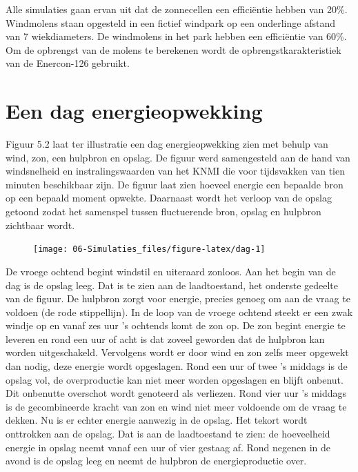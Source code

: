 \documentclass[
  11pt,
  a4paper,
]{book}
\begin{document}
Alle simulaties gaan ervan uit dat de zonnecellen een efficiëntie hebben van 20\%. Windmolens staan opgesteld in een fictief windpark op een onderlinge afstand van 7 wiekdiameters. De windmolens in het park hebben een efficiëntie van 60\%. Om de opbrengst van de molens te berekenen wordt de opbrengstkarakteristiek van de Enercon-126 gebruikt.

\hypertarget{een-dag-energieopwekking}{%
\section{Een dag energieopwekking}\label{een-dag-energieopwekking}}

Figuur 5.2 laat ter illustratie een dag energieopwekking zien met behulp van wind, zon, een hulpbron en opslag. De figuur werd samengesteld aan de hand van windsnelheid en instralingswaarden van het KNMI die voor tijdsvakken van tien minuten beschikbaar zijn. De figuur laat zien hoeveel energie een bepaalde bron op een bepaald moment opwekte. Daarnaast wordt het verloop van de opslag getoond zodat het samenspel tussen fluctuerende bron, opslag en hulpbron zichtbaar wordt.

\begin{figure}

{\centering \texttt{[image: 06-Simulaties\_files/figure-latex/dag-1]} 

}

\end{figure}

De vroege ochtend begint windstil en uiteraard zonloos. Aan het begin van de dag is de opslag leeg. Dat is te zien aan de laadtoestand, het onderste gedeelte van de figuur. De hulpbron zorgt voor energie, precies genoeg om aan de vraag te voldoen (de rode stippellijn). In de loop van de vroege ochtend steekt er een zwak windje op en vanaf zes uur 's ochtends komt de zon op. De zon begint energie te leveren en rond een uur of acht is dat zoveel geworden dat de hulpbron kan worden uitgeschakeld. Vervolgens wordt er door wind en zon zelfs meer opgewekt dan nodig, deze energie wordt opgeslagen. Rond een uur of twee 's middags is de opslag vol, de overproductie kan niet meer worden opgeslagen en blijft onbenut. Dit onbenutte overschot wordt genoteerd als verliezen. Rond vier uur 's middags is de gecombineerde kracht van zon en wind niet meer voldoende om de vraag te dekken. Nu is er echter energie aanwezig in de opslag. Het tekort wordt onttrokken aan de opslag. Dat is aan de laadtoestand te zien: de hoeveelheid energie in opslag neemt vanaf een uur of vier gestaag af. Rond negenen in de avond is de opslag leeg en neemt de hulpbron de energieproductie over.
\end{document}
